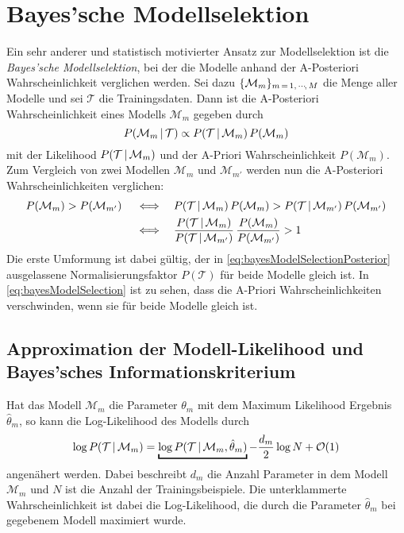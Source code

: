 	\section{Bayes'sche Modellselektion}
		Ein sehr anderer und statistisch motivierter Ansatz zur Modellselektion ist die \emph{Bayes'sche Modellselektion}, bei der die Modelle anhand der A-Posteriori Wahrscheinlichkeit verglichen werden. Sei dazu \( \{ \mathcal{M}_m \}_{m \,=\, 1,\,\cdots\!,\,M} \) die Menge aller Modelle und sei \(\mathcal{T}\) die Trainingsdaten. Dann ist die A-Posteriori Wahrscheinlichkeit eines Modells \( \mathcal{M}_m \) gegeben durch
		\begin{equation}
			P(\mathcal{M}_m \,\vert\, \mathcal{T}) \propto P(\mathcal{T} \,\vert\, \mathcal{M}_m) \, P(\mathcal{M}_m)  \label{eq:bayesModelSelectionPosterior}
		\end{equation}
		mit der Likelihood \( P(\mathcal{T} \,\vert\, \mathcal{M}_m) \) und der A-Priori Wahrscheinlichkeit \( P(\mathcal{M}_m) \). Zum Vergleich von zwei Modellen \( \mathcal{M}_m \) und \( \mathcal{M}_{m'} \) werden nun die A-Posteriori Wahrscheinlichkeiten verglichen:
		\begin{align}
			P(\mathcal{M}_m) > P(\mathcal{M}_{m'})
			\quad\iff&\quad  P(\mathcal{T} \,\vert\, \mathcal{M}_m) \, P(\mathcal{M}_m) > P(\mathcal{T} \,\vert\, \mathcal{M}_{m'}) \, P(\mathcal{M}_{m'}) \\
			\quad\iff&\quad  \frac{P(\mathcal{T} \,\vert\, \mathcal{M}_m)}{P(\mathcal{T} \,\vert\, \mathcal{M}_{m'})} \, \frac{P(\mathcal{M}_m)}{P(\mathcal{M}_{m'})} > 1  \label{eq:bayesModelSelection}
		\end{align}
		Die erste Umformung ist dabei gültig, der in \eqref{eq:bayesModelSelectionPosterior} ausgelassene Normalisierungsfaktor \( P(\mathcal{T}) \) für beide Modelle gleich ist. In \eqref{eq:bayesModelSelection} ist zu sehen, dass die A-Priori Wahrscheinlichkeiten verschwinden, wenn sie für beide Modelle gleich ist.

		\subsection{Approximation der Modell-Likelihood und Bayes'sches Informationskriterium}
			Hat das Modell \( \mathcal{M}_m \) die Parameter \( \theta_m \) mit dem Maximum Likelihood Ergebnis \( \hat{\theta}_m \), so kann die Log-Likelihood des Modells durch
			\begin{equation}
				\log P(\mathcal{T} \given \mathcal{M}_m) = \underbracket{\log P(\mathcal{T} \given \mathcal{M}_m, \hat{\theta}_m)} - \frac{d_m}{2} \log N + \mathcal{O}(1)  \label{eq:bayesModelSeletcionApproxLikelihood}
			\end{equation}
			angenähert werden. Dabei beschreibt \( d_m \) die Anzahl Parameter in dem Modell \(\mathcal{M}_m\) und \(N\) ist die Anzahl der Trainingsbeispiele. Die unterklammerte Wahrscheinlichkeit ist dabei die Log-Likelihood, die durch die Parameter \(\hat{\theta}_m\) bei gegebenem Modell maximiert wurde.

